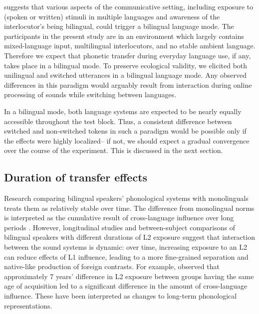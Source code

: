 \documentclass[12 pt]{article}
\begin{document}
\cite{grosjean1998studying} suggests that various aspects of the communicative setting, including exposure to (spoken or written) stimuli in multiple languages and awareness of the interlocutor's being bilingual, could trigger a bilingual language mode. The participants in the present study are in an environment which largely contains mixed-language input, multilingual interlocutors, and no stable ambient language. Therefore we expect that phonetic transfer during everyday language use, if any, takes place in a bilingual mode.  To preserve ecological validity, we elicited both unilingual and switched utterances in a bilingual language mode. Any observed differences in this paradigm would arguably result from interaction during online processing of sounds while switching between languages. 

In a bilingual mode, both language systems are expected to be nearly equally accessible throughout the test block. Thus, a consistent difference between switched and non-switched tokens in such a paradigm would be possible only if the effects were highly localized-- if not, we should expect a gradual convergence over the course of the experiment. This is discussed in the next section.


\subsection{Duration of transfer effects} \label{duration}

Research comparing bilingual speakers' phonological systems with monolinguals treats them as relatively stable over time. The difference from monolingual norms is interpreted as the cumulative result of cross-language influence over long periods \citep[e.g.][]{guion2003vowel, caramazza1973acquisition}. However, longitudinal studies %
and between-subject comparisons of bilingual speakers with different durations of L2 exposure suggest that interaction between the sound systems is dynamic: over time, increasing exposure to an L2 can reduce effects of L1 influence, leading to a more fine-grained separation and native-like production of foreign contrasts. For example, \cite[][vowel quality]{bohn1992production} 
observed that approximately 7 years' difference in L2 exposure between groups having the same age of acquisition led to a significant difference in the amount of cross-language influence. These have been interpreted as changes to long-term phonological representations.
\end{document}
